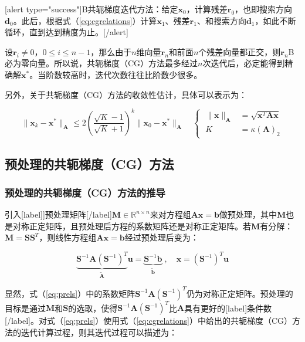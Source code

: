 \documentclass[12pt, UTF8, nofonts]{ctexart}
\begin{document}
[alert type="success"]B共轭梯度迭代方法：给定$\boldsymbol{x}_0$，计算残差$\boldsymbol{r}_0$，也即搜索方向$\boldsymbol{d}_0$。此后，根据式（\ref{eq:cgrelations}）计算$\boldsymbol{x}_1$、残差$\boldsymbol{r}_1$、和搜索方向$\boldsymbol{d}_1$，如此不断循环，直到达到精度为止。[/alert]

设$\boldsymbol{r}_i\neq0$，$0 \leq i \leq n-1$，那么由于$n$维向量$\boldsymbol{r}_n$和前面$n$个残差向量都正交，则$\boldsymbol{r}_n$B必为零向量。所以说，共轭梯度（CG）方法最多经过$n$次迭代后，必定能得到精确解$\boldsymbol{x}^{\ast}$。当阶数较高时，迭代次数往往比阶数少很多。

另外，关于共轭梯度（CG）方法的收敛性估计，具体可以表示为：

\[
    \|\boldsymbol{x}_k-\boldsymbol{x}^{\ast}\|_{\boldsymbol{A}} \leq
    2\left( \dfrac{\sqrt{K}-1}{\sqrt{K}+1} \right)^k \|\boldsymbol{x}_0-\boldsymbol{x}^{\ast}\|_{\boldsymbol{A}} \quad
    \left\{ \; \begin{aligned}
        \|\boldsymbol{x}\|_{\boldsymbol{A}} &= \sqrt{\boldsymbol{x}^T\boldsymbol{Ax}} \\
        K &= \kappa(\boldsymbol{A})_2
    \end{aligned} \right.
\]

\subsection*{预处理的共轭梯度（CG）方法}

\subsubsection*{预处理的共轭梯度（CG）方法的推导}

引入[label]]预处理矩阵[/label]$\boldsymbol{M}\in\mathbb{R}^{n \times n}$来对方程组$\boldsymbol{Ax}=\boldsymbol{b}$做预处理，其中$\boldsymbol{M}$也是对称正定矩阵，且预处理后方程的系数矩阵还是对称正定矩阵。若$\boldsymbol{M}$有分解：$\boldsymbol{M}=\boldsymbol{SS}^T$，则线性方程组$\boldsymbol{Ax}=\boldsymbol{b}$经过预处理后变为：

\begin{equation}
    \label{eq:prels}
    \underbrace{\boldsymbol{S}^{-1}\boldsymbol{A}(\boldsymbol{S}^{-1})^T}_{\tilde{\boldsymbol{A}}}\boldsymbol{u} = \underbrace{\boldsymbol{S}^{-1}\boldsymbol{b}}_{\tilde{\boldsymbol{b}}} \;, \quad
    \boldsymbol{x} = (\boldsymbol{S}^{-1})^T\boldsymbol{u}
\end{equation}

显然，式（\ref{eq:prels}）中的系数矩阵$\boldsymbol{S}^{-1}\boldsymbol{A}(\boldsymbol{S}^{-1})^T$仍为对称正定矩阵。预处理的目标是通过$\boldsymbol{M}$和$\boldsymbol{S}$的选取，使得$\boldsymbol{S}^{-1}\boldsymbol{A}(\boldsymbol{S}^{-1})^T$比$\boldsymbol{A}$具有更好的[label]条件数[/label]。对式（\ref{eq:prels}）使用式（\ref{eq:cgrelations}）中给出的共轭梯度（CG）方法的迭代计算过程，则其迭代过程可以描述为：
\end{document}
